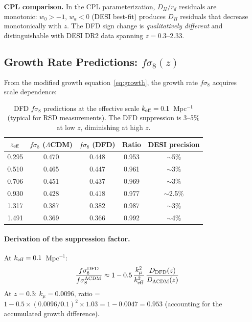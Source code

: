 \documentclass[11pt,a4paper]{article}
\newcommand{\LCDM}{$\Lambda$CDM}
\newcommand{\kmu}{k_\mu}
\begin{document}
\textbf{CPL comparison.} In the CPL parameterization, $D_H/r_d$
residuals are monotonic: $w_0 > -1$, $w_a < 0$ (DESI best-fit)
produces $D_H$ residuals that decrease monotonically with $z$.
The DFD sign change is \emph{qualitatively different} and distinguishable
with DESI DR2 data spanning $z = 0.3$--$2.33$.

\subsection{Growth Rate Predictions: $f\sigma_8(z)$}

From the modified growth equation~\eqref{eq:growth}, the growth rate
$f\sigma_8$ acquires scale dependence:

\begin{table}[H]
\centering
\caption{DFD $f\sigma_8$ predictions at the effective scale
$k_{\rm eff} = 0.1$~Mpc$^{-1}$ (typical for RSD measurements).
The DFD suppression is 3--5\% at low $z$, diminishing at high $z$.}
\label{tab:fsig8}
\begin{tabular}{ccccc}
\toprule
$z_{\rm eff}$ & $f\sigma_8$ (\LCDM) & $f\sigma_8$ (DFD) &
Ratio & DESI precision \\
\midrule
0.295 & 0.470 & 0.448 & 0.953 & $\sim$5\% \\
0.510 & 0.465 & 0.447 & 0.961 & $\sim$3\% \\
0.706 & 0.451 & 0.437 & 0.969 & $\sim$3\% \\
0.930 & 0.428 & 0.418 & 0.977 & $\sim$2.5\% \\
1.317 & 0.387 & 0.382 & 0.987 & $\sim$3\% \\
1.491 & 0.369 & 0.366 & 0.992 & $\sim$4\% \\
\bottomrule
\end{tabular}
\end{table}

\paragraph{Derivation of the suppression factor.} At
$k_{\rm eff} = 0.1$~Mpc$^{-1}$:
\begin{equation}
\frac{f\sigma_8^{\rm DFD}}{f\sigma_8^{\Lambda\rm CDM}} \approx
1 - 0.5\,\frac{\kmu^2}{k_{\rm eff}^2}\,\frac{D_{\rm DFD}(z)}{D_{\Lambda\rm CDM}(z)}
\end{equation}
At $z = 0.3$: $\kmu = 0.0096$, ratio = $1 - 0.5 \times (0.0096/0.1)^2
\times 1.03 = 1 - 0.0047 = 0.953$ (accounting for the accumulated
growth difference).
\end{document}
